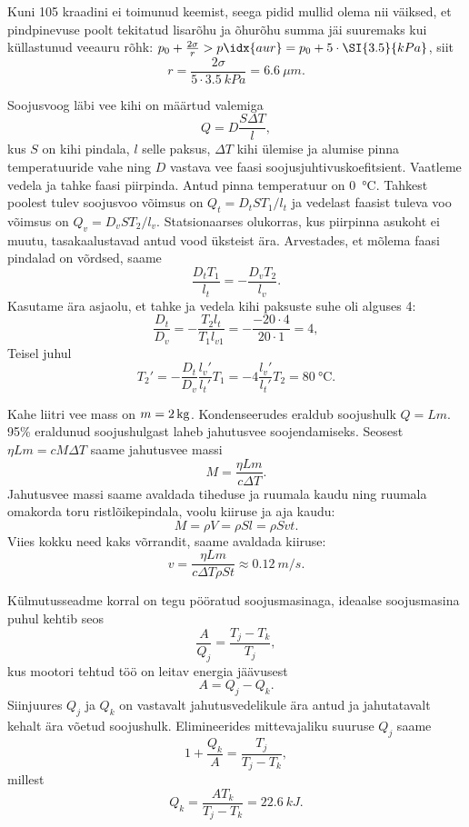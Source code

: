 \documentclass[10pt, twoside]{article}
\begin{document}
{Kuni 105 kraadini ei toimunud keemist, seega pidid mullid olema nii väiksed, et pindpinevuse poolt tekitatud lisarõhu ja õhurõhu summa jäi suuremaks kui küllastunud veeauru rõhk: $p_0 + \frac{2\sigma}{r} > p\idx{aur} = p_0 + 5 \cdot \SI{3.5}{kPa}$, siit 
\[
r = \frac{2\sigma}{5\cdot\SI{3.5}{kPa}} = \SI{6.6}{\mu m}.
\]
\probend
\bigskip


\solu
Soojusvoog läbi vee kihi on määrtud valemiga
\[
Q = D\frac{S\Delta T}{l},
\]
kus $S$ on kihi pindala, $l$ selle paksus, $\Delta T$ kihi ülemise ja alumise pinna temperatuuride vahe ning $D$ vastava vee faasi soojusjuhtivuskoefitsient. Vaatleme vedela ja tahke faasi piirpinda. Antud pinna temperatuur on \SI{0}{\degreeCelsius}. Tahkest poolest tulev soojusvoo võimsus on
$Q_t = D_tST_1/l_t$
ja vedelast faasist tuleva voo võimsus on
$Q_v = D_vST_2/l_v$.
Statsionaarses olukorras, kus piirpinna asukoht ei muutu, tasakaalustavad antud vood üksteist ära. Arvestades, et mõlema faasi pindalad on võrdsed, saame
\[
\frac{D_tT_1}{l_t} = -\frac{D_vT_2}{l_v}.
\]
Kasutame ära asjaolu, et tahke ja vedela kihi paksuste suhe oli alguses \num{4}:
\[
\frac{D_t}{D_v} = -\frac{T_{2} l_{t}}{T_1 l_{v1}}=-\frac{\num{-20}\cdot \num{4}}{\num{20}\cdot \num{1}} = \num{4},
\]
Teisel juhul
\[
T_{2}' = -\frac{D_{t}}{D_{v}}\frac{l_{v}'}{l_{t}'} T_1 = \num{-4}\frac{l_v'}{l_t'} T_2 = \SI{80}{\degreeCelsius}.
\]
\probend
\bigskip


\solu
Kahe liitri vee mass on $m=\SI 2{kg}$. Kondenseerudes eraldub soojushulk $Q=Lm$.
95\% eraldunud soojushulgast laheb jahutusvee soojendamiseks. Seosest $\eta Lm=cM\Delta T$ saame jahutusvee massi
\[M=\frac {\eta L m}{c\Delta T}.\]
Jahutusvee massi saame avaldada tiheduse ja ruumala kaudu ning ruumala omakorda toru ristlõikepindala, voolu kiiruse ja aja kaudu:
\[M=\rho V=\rho Sl=\rho Svt.\]
Viies kokku need kaks võrrandit, saame avaldada kiiruse:
\[v=\frac {\eta Lm}{c\Delta T \rho S t}\approx \SI{0,12}{m/s}.\]
\probend
\bigskip


\solu
Külmutusseadme korral on tegu pööratud soojusmasinaga, ideaalse
soojusmasina puhul kehtib seos
\[
\frac{A}{Q_{j}}=\frac{T_{j} - T_{k}}{T_{j}},
\]
kus mootori tehtud töö
on leitav energia jäävusest
\[
A = Q_j - Q_k.
\]
Siinjuures $Q_j$ ja $Q_k$ on vastavalt jahutusvedelikule ära antud ja jahutatavalt kehalt
ära võetud soojushulk. Elimineerides mittevajaliku suuruse $Q_j$ saame
\[
1+\frac{Q_{k}}{A}=\frac{T_{j}}{T_{j}-T_{k}},
\]
millest 
\[
Q_{k}=\frac{A T_{k}}{T_{j}-T_{k}} = \SI{22,6}{kJ}.
\]
\probend
\bigskip

}
\end{document}
